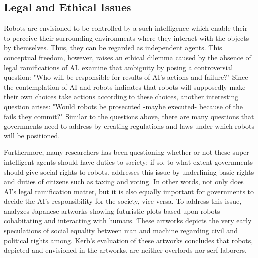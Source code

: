 \documentclass[man]{apa6}
\begin{document}

 
\subsection{Legal and Ethical Issues}
Robots are envisioned to be controlled by a such intelligence which enable their to perceive their surrounding environments where they interact with the objects by themselves. Thus, they can be regarded as independent agents.
This conceptual freedom, however, raises an ethical dilemma caused by the absence of legal ramifications of AI.
 examine that ambiguity by posing a controversial question: "Who will be responsible for results of AI's actions and failure?"
Since the contemplation of AI and robots indicates that robots will supposedly make their own choices take actions according to these choices, another interesting question arises: "Would robots be prosecuted -maybe executed- because of the fails they commit?"
Similar to the questions above, there are many questions that governments need to address by creating regulations and laws under which robots will be positioned. \par
Furthermore, many researchers has been questioning whether or not these super-intelligent agents should have duties to society; if so, to what extent governments should give social rights to robots.  addresses this issue by underlining basic rights and duties of citizens such as taxing and voting.
In other words, not only does AI's legal ramification matter, but it is also equally important for governments to decide the AI's responsibility for the society, vice versa.
To address this issue,  analyzes Japanese artworks showing futuristic plots based upon robots cohabitating and interacting with humans.
These artworks depicts the very early speculations of social equality between man and machine regarding civil and political rights among.
Kerb's evaluation of these artworks concludes that robots, depicted and envisioned in the artworks, are neither overlords nor serf-laborers. 
\end{document}
